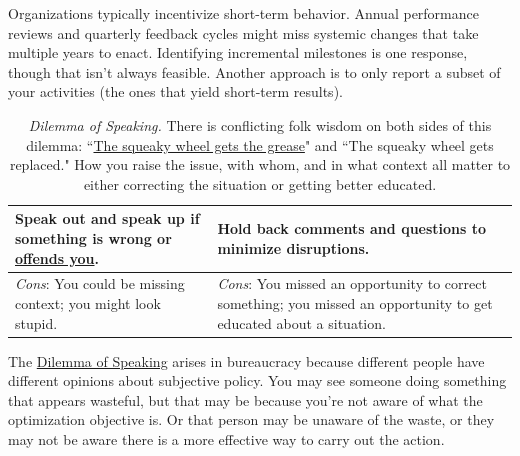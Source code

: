Organizations typically incentivize short-term behavior. Annual performance reviews and quarterly feedback cycles might miss systemic changes that take multiple years to enact. Identifying incremental milestones is one response, though that isn't always feasible. Another approach is to only report a subset of your activities (the ones that yield short-term results). 

\begin{center}
\begin{table}[H] %
\begin{tabular}{ | m{\dilemmatablewidth}| m{\dilemmatablewidth} | } 
  \hline
  \textbf{Speak out and speak up if something is wrong or \href{https://en.wikipedia.org/wiki/Moral_injury}{offends you}.
  \index{Wikipedia!\href{https://en.wikipedia.org/wiki/Moral_injury}{moral injury}}
  } &
  \textbf{Hold back comments and questions to minimize disruptions.} \\
  \hline
  \textit{Cons}: You could be missing context; you might look stupid. & 
  \textit{Cons}: You missed an opportunity to correct something; you missed an opportunity to get educated about a situation. \\
  \hline
\end{tabular}
\caption{
\textit{Dilemma of Speaking.}
There is conflicting folk wisdom on both sides of this dilemma: 
``\href{https://en.wikipedia.org/wiki/The_squeaky_wheel_gets_the_grease}{The squeaky wheel gets the grease}" 
and 
``The squeaky wheel gets replaced." 
How you raise the issue, with whom, and in what context all matter to either correcting the situation or getting better educated.
}
\label{table:speak-up-or-hold-back}
\end{table}
\end{center}

The \href{table:speak-up-or-hold-back}{Dilemma of Speaking} arises in bureaucracy because different people have different opinions about subjective policy. You may see someone doing something that appears wasteful, but that may be because you're not aware of what the optimization objective is. Or that person may be unaware of the waste, or they may not be aware there is a more effective way to carry out the action. 

